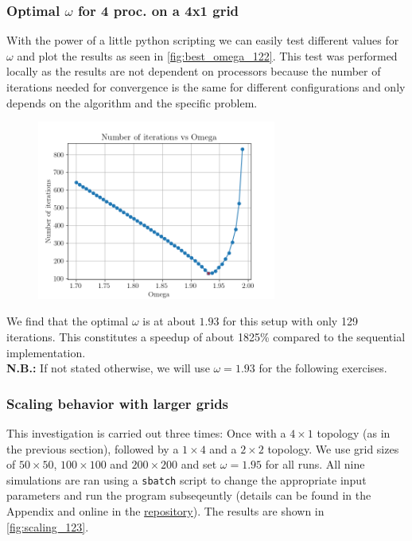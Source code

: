\subsubsection{Optimal $\omega$ for 4 proc. on a 4x1 grid}
\label{subsec:optimal_omega}
With the power of a little python scripting we can easily test different values for $\omega$ and plot the results as seen in \autoref{fig:best_omega_122}. This test was performed locally as the results are not dependent on processors because the number of iterations needed for convergence is the same for different configurations and only depends on the algorithm and the specific problem.

\begin{figure}[H]
    \centering
    \includegraphics[width=0.7\textwidth]{../fig/lab1/best_omega_122.png}
    \caption{}
    \label{fig:best_omega_122}
\end{figure}
We find that the optimal $\omega$ is at about $1.93$ for this setup with only 129 iterations. This constitutes a speedup of about 1825\% compared to the sequential implementation. \\

\textbf{N.B.:} If not stated otherwise, we will use $\omega = 1.93$ for the following exercises. 

\subsubsection{Scaling behavior with larger grids}
\label{subsec:scaling}
This investigation is carried out three times: Once with a $4\times 1$ topology (as in the previous section), followed by a $1\times 4$ and a $2\times 2$ topology. We use grid sizes of $50\times 50$, $100\times 100$ and $200\times 200$ and set $\omega = 1.95$ for all runs. All nine simulations are ran using a \texttt{sbatch} script to change the appropriate input parameters and run the program subseqeuntly (details can be found in the Appendix and online in the \href{https://github.com/etschgi1/HPC}{repository}). The results are shown in \autoref{fig:scaling_123}.

